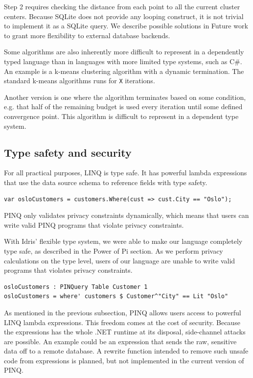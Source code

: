 \documentclass[12pt]{article}
\begin{document}
Step 2 requires checking the distance from each point to all the current cluster centers.
Because SQLite does not provide any looping construct, it is not trivial to implement it as a SQLite query.
We describe possible solutions in Future work to grant more flexibility to external database backends.

Some algorithms are also inherently more difficult to represent in a dependently typed language than in languages with more limited type systems, such as C\#.
An example is a k-means clustering algorithm with a dynamic termination.
The standard k-means algorithms runs for \texttt{X} iterations.

Another version is one where the algorithm terminates based on some condition, e.g. that half of the remaining budget is used every iteration until some defined convergence point.
This algorithm is difficult to represent in a dependent type system. %

\subsection{Type safety and security}

For all practical purposes, LINQ is type safe.
It has powerful lambda expressions that use the data source schema to reference fields with type safety.

\begin{lstlisting}[caption = LINQ where query, captionpos=b]
var osloCustomers = customers.Where(cust => cust.City == "Oslo"); 
\end{lstlisting}

PINQ only validates privacy constraints dynamically, which means that users can write valid PINQ programs that violate privacy constraints.

With Idris' flexible type system, we were able to make our language completely type safe, as described in the Power of Pi section.
As we perform privacy calculations on the type level, users of our language are unable to write valid programs that violates privacy constraints.

\begin{lstlisting}[caption = LANGUAGE NAME where query, captionpos=b]
osloCustomers : PINQuery Table Customer 1
osloCustomers = where' customers $ Customer^"City" == Lit "Oslo"
\end{lstlisting}

As mentioned in the previous subsection, PINQ allows users access to powerful LINQ lambda expressions.
This freedom comes at the cost of security.
Because the expressions has the whole .NET runtime at its disposal, side-channel attacks are possible.
An example could be an expression that sends the raw, sensitive data off to a remote database.
A rewrite function intended to remove such unsafe code from expressions is planned, but not implemented in the current version of PINQ.
\end{document}
